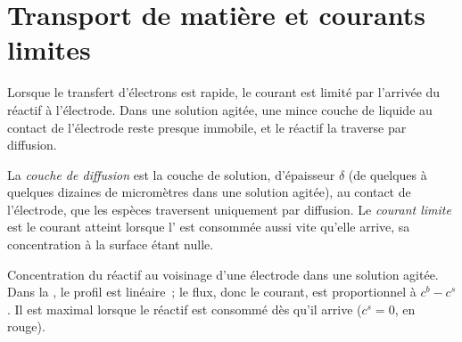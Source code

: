 \section{Transport de matière et courants limites}

Lorsque le transfert d'électrons est rapide, le courant est limité par l'arrivée du
réactif à l'électrode. Dans une solution agitée, une mince couche de liquide
au contact de l'électrode reste presque immobile, et le réactif la traverse par
diffusion.

\begin{definition}\label{def:b2:current-potential-curves:limiting-current}
La \emph{couche de diffusion} est la couche de solution,
d'épaisseur $\delta$ (de quelques à quelques dizaines de micromètres dans une solution
agitée), au contact de l'électrode, que les espèces traversent uniquement par
diffusion. Le \emph{courant limite} est le courant
atteint lorsque l' est consommée aussi vite qu'elle arrive, sa
concentration à la surface étant nulle.
\end{definition}

\begin{omfigure}

{\small Concentration du réactif au voisinage d'une électrode dans une solution
agitée. Dans la , le profil est linéaire~; le flux, donc le
courant, est proportionnel à $c^b - c^s$. Il est maximal lorsque le réactif est
consommé dès qu'il arrive ($c^s = 0$, en rouge).}
\end{omfigure}

